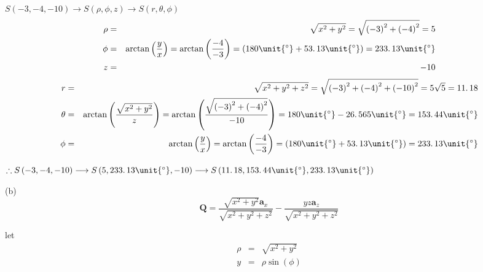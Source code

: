 \documentclass{article}
\begin{document}
$S\left( -3,-4,-10\right) \longrightarrow S\left( \rho ,\phi ,z\right)
\longrightarrow S\left( r,\theta ,\phi \right) $ 
\begin{eqnarray*}
\rho &=&\sqrt{x^{2}+y^{2}}=\sqrt{\left( -3\right) ^{2}+\left( -4\right) ^{2}}%
=5 \\
\phi &=&\arctan \left( \dfrac{y}{x}\right) =\arctan \left( \dfrac{-4}{-3}%
\right) =\left( 180\unit{%
{{}^\circ}%
}+53.\,\allowbreak 13\unit{%
{{}^\circ}%
}\right) =233.\,\allowbreak 13\unit{%
{{}^\circ}%
} \\
z &=&-10
\end{eqnarray*}
\begin{eqnarray*}
r &=&\sqrt{x^{2}+y^{2}+z^{2}}=\sqrt{\left( -3\right) ^{2}+\left( -4\right)
^{2}+\left( -10\right) ^{2}}=5\sqrt{5}=\allowbreak 11.\,\allowbreak 18 \\
\theta &=&\arctan \left( \dfrac{\sqrt{x^{2}+y^{2}}}{z}\right) =\arctan
\left( \dfrac{\sqrt{\left( -3\right) ^{2}+\left( -4\right) ^{2}}}{-10}%
\right) =180\unit{%
{{}^\circ}%
}-26.\,\allowbreak 565\unit{%
{{}^\circ}%
}=153.\,\allowbreak 44\unit{%
{{}^\circ}%
} \\
\phi &=&\arctan \left( \dfrac{y}{x}\right) =\arctan \left( \dfrac{-4}{-3}%
\right) =\left( 180\unit{%
{{}^\circ}%
}+53.\,\allowbreak 13\unit{%
{{}^\circ}%
}\right) =233.\,\allowbreak 13\unit{%
{{}^\circ}%
}
\end{eqnarray*}

$\therefore S\left( -3,-4,-10\right) \longrightarrow S\left(
5,233.\,\allowbreak 13\unit{%
{{}^\circ}%
},-10\right) \longrightarrow S\left( 11.\,\allowbreak 18,153.\,\allowbreak 44%
\unit{%
{{}^\circ}%
},233.\,\allowbreak 13\unit{%
{{}^\circ}%
}\right) $

(b) 
\[
\mathbf{Q=}\dfrac{\sqrt{x^{2}+y^{2}}\mathbf{a}_{x}}{\sqrt{x^{2}+y^{2}+z^{2}}}%
-\dfrac{yz\mathbf{a}_{z}}{\sqrt{x^{2}+y^{2}+z^{2}}} 
\]

let%
\begin{eqnarray*}
\rho &=&\sqrt{x^{2}+y^{2}} \\
y &=&\rho \sin \left( \phi \right)
\end{eqnarray*}
\end{document}
